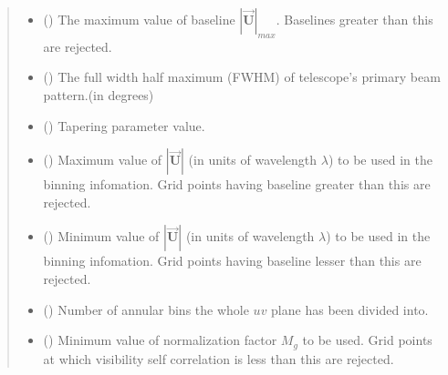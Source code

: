 \documentclass[a4paper,11pt,oneside,english,openany]{sphinxmanual}
\begin{document}
\begin{fulllineitems}
\begin{quote}
\begin{description}
\begin{itemize}
\item {} 
\sphinxAtStartPar
{} () \textendash{} The maximum value of baseline \(|\vec{\textbf{U}}|_{max}\). Baselines greater than this are rejected.

\item {} 
\sphinxAtStartPar
{} () \textendash{} The full width half maximum (FWHM) of telescope’s primary beam pattern.(in degrees)

\item {} 
\sphinxAtStartPar
{} () \textendash{} Tapering parameter value.

\item {} 
\sphinxAtStartPar
{} () \textendash{} Maximum value of \(|\vec{\textbf{U}}|\) (in units of wavelength \(\lambda\)) to be used in the binning infomation. Grid points having baseline greater than this are rejected.

\item {} 
\sphinxAtStartPar
{} () \textendash{} Minimum value of \(|\vec{\textbf{U}}|\) (in units of wavelength \(\lambda\)) to be used in the binning infomation. Grid points having baseline lesser than this are rejected.

\item {} 
\sphinxAtStartPar
{} () \textendash{} Number of annular bins the whole \(uv\) plane has been divided into.

\item {} 
\sphinxAtStartPar
{} () \textendash{} Minimum value of normalization factor \(M_g\) to be used. Grid points at which visibility self correlation is less than this are rejected.


\end{itemize}
\end{description}
\end{quote}
\end{fulllineitems}
\end{document}
